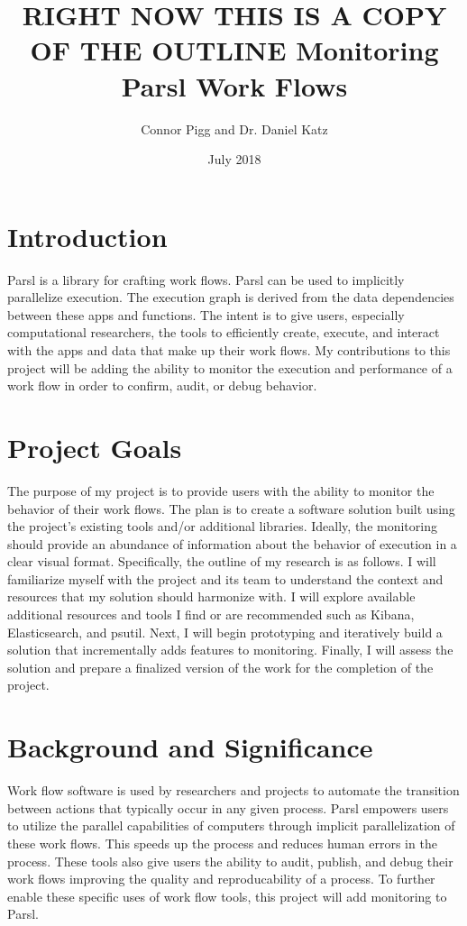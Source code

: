\documentclass{article}
\title{\textbf{RIGHT NOW THIS IS A COPY OF THE OUTLINE}
Monitoring Parsl Work Flows}
\author{Connor Pigg and Dr. Daniel Katz}
\date{July 2018}
\begin{document}
\maketitle

\section{Introduction}
Parsl is a library for crafting work flows.\citep{babuji_yadu_2017_853492}
Parsl can be used to implicitly parallelize execution.
The execution graph is derived from the data dependencies between these apps and functions.
The intent is to give users, especially computational researchers, the tools to efficiently create, execute, and interact with the apps and data that make up their work flows.
My contributions to this project will be adding the ability to monitor the execution and performance of a work flow in order to confirm, audit, or debug behavior.

\section{Project Goals}
The purpose of my project is to provide users with the ability to monitor the behavior of their work flows.
The plan is to create a software solution built using the project's existing tools and/or additional libraries.
Ideally, the monitoring should provide an abundance of information about the behavior of execution in a clear visual format.
Specifically, the outline of my research is as follows.
I will familiarize myself with the project and its team to understand the context and resources that my solution should harmonize with.
I will explore available additional resources and tools I find or are recommended such as Kibana, Elasticsearch, and psutil.
Next, I will begin prototyping and iteratively build a solution that incrementally adds features to monitoring.
Finally, I will assess the solution and prepare a finalized version of the work for the completion of the project.

\section{Background and Significance}
Work flow software is used by researchers and projects to automate the transition between actions that typically occur in any given process.
Parsl empowers users to utilize the parallel capabilities of computers through implicit parallelization of these work flows.
This speeds up the process and reduces human errors in the process.
These tools also give users the ability to audit, publish, and debug their work flows improving the quality and reproducability of a process.
To further enable these specific uses of work flow tools, this project will add monitoring to Parsl.
\end{document}
